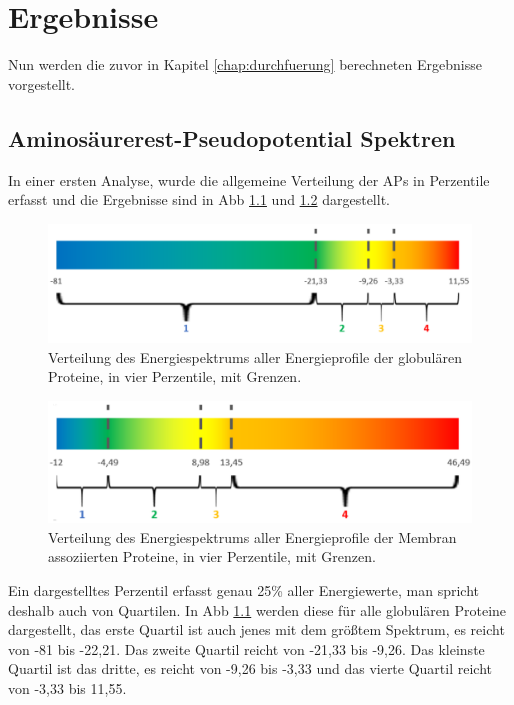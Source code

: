 \chapter{Ergebnisse}

Nun werden die zuvor in Kapitel \ref{chap:durchfuerung} berechneten Ergebnisse vorgestellt.


\section{Aminosäurerest-Pseudopotential Spektren}

In einer ersten Analyse, wurde die allgemeine Verteilung der \ac{APs} in Perzentile erfasst und die Ergebnisse sind in \ac{Abb} \ref{fig:quartiles_glob} und \ref{fig:quartiles_memb} dargestellt. 

\begin{figure}
\centering
\includegraphics[width=.95\textwidth]{images/Quartil_glob.png}
\caption{Verteilung des Energiespektrums aller Energieprofile der globulären Proteine, in vier Perzentile, mit Grenzen.}
\label{fig:quartiles_glob}
\end{figure}

\begin{figure}
\centering
\includegraphics[width=.95\textwidth]{images/Quartil_memb.png}
\caption{Verteilung des Energiespektrums aller Energieprofile der Membran assoziierten Proteine, in vier Perzentile, mit Grenzen.}
\label{fig:quartiles_memb}
\end{figure}


Ein dargestelltes Perzentil erfasst genau 25\% aller Energiewerte, man spricht deshalb auch von Quartilen. In \ac{Abb} \ref{fig:quartiles_glob} werden diese für alle globulären Proteine dargestellt, das erste Quartil ist auch jenes mit dem größtem Spektrum, es reicht von -81 bis -22,21. Das zweite Quartil reicht von -21,33 bis -9,26. Das kleinste Quartil ist das dritte, es reicht von -9,26 bis -3,33 und das vierte Quartil reicht von -3,33 bis 11,55. 

